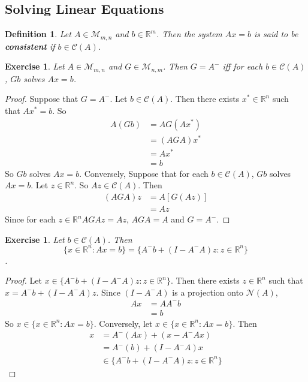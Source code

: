 \documentclass[12pt]{amsart}
\newtheorem{defn}[thm]{Definition}
\newtheorem{ex}[thm]{Exercise}
\newcommand{\R}{\mathbb{R}}
\newcommand{\MC}{\mathcal{C}}
\newcommand{\MN}{\mathcal{N}}
\newcommand{\MM}{\mathcal{M}}
\begin{document}
\subsection{Solving Linear Equations}

\begin{defn}
Let $A \in \MM_{m,n}$ and $b \in \R^m$. Then the system $Ax=b$ is said to be \textbf{consistent} if $b \in \MC(A)$.
\end{defn}

\begin{ex}
Let $A \in \MM_{m,n}$ and $G \in \MM_{n,m}$. Then $G = A^-$ iff for each $b \in \MC(A)$, $Gb$ solves $Ax = b$. 
\end{ex}

\begin{proof}
Suppose that $G = A^-$. Let $b \in \MC(A)$. Then there exists $x^* \in \R^n$ such that $Ax^* = b$. So
\begin{align*}
A(Gb)
&= AG(Ax^*) \\
&= (AGA)x^* \\
&= Ax^* \\
&= b
\end{align*}
So $Gb$ solves $Ax =b$. Conversely, Suppose that for each $b \in \MC(A)$, $Gb$ solves $Ax = b$. Let $z \in \R^n$. So $Az \in \MC(A)$. Then  
\begin{align*}
(AGA)z 
&= A[G(Az)] \\
&= Az
\end{align*}
Since for each $z \in \R^n AGAz = Az$, $AGA = A$ and $G = A^-$.
\end{proof}
\vspace{2mm}

\begin{ex}
Let $b \in \MC(A)$. Then $$\{x \in \R^n: Ax = b\} = \{A^-b+(I-A^-A)z: z \in \R^n \}$$.
\end{ex}

\begin{proof}
Let $x \in \{A^-b+(I-A^-A)z: z \in \R^n \}$. Then there exists $z \in \R^n$ such that $x = A^-b+(I-A^-A)z$. Since $(I-A^-A)$ is a projection onto $\MN(A)$, 
\begin{align*}
Ax
&= AA^-b \\
&= b
\end{align*}
So $x \in \{x \in \R^n: Ax = b\}$. Conversely, let $x \in \{x \in \R^n: Ax = b\}$. Then 
\begin{align*}
x 
&= A^-(Ax) + (x - A^-Ax) \\
&= A^-(b) + (I-A^-A)x \\
& \in \{A^-b+(I-A^-A)z: z \in \R^n \}
\end{align*}
\end{proof}
\end{document}
